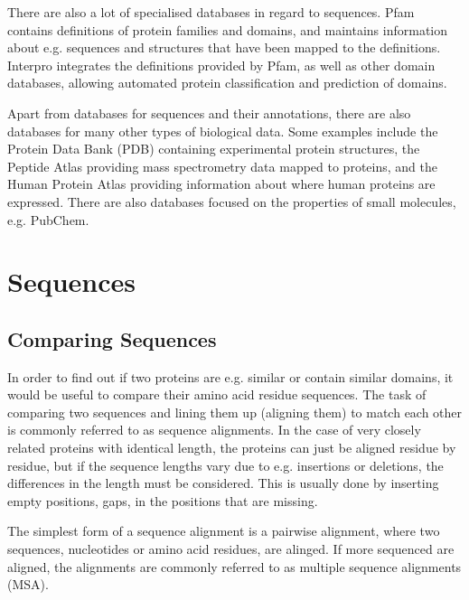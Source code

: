 \documentclass[a4paper, twoside, 12pt, openright]{report}
\begin{document}
There are also a lot of specialised databases in regard to sequences. Pfam\cite{finn_pfam:_2014} contains definitions of protein families and domains, and maintains information about e.g. sequences and structures that have been mapped to the definitions. Interpro\cite{finn_interpro_2017} integrates the definitions provided by Pfam, as well as other domain databases, allowing automated protein classification and prediction of domains.

Apart from databases for sequences and their annotations, there are also databases for many other types of biological data. Some examples include the Protein Data Bank (PDB)\cite{berman_protein_2000}  containing experimental protein structures, the Peptide Atlas\cite{desiere_peptideatlas_2006} providing mass spectrometry data mapped to proteins, and the Human Protein Atlas\cite{uhlen_tissue-based_2015} providing information about where human proteins are expressed. There are also databases focused on the properties of small molecules, e.g. PubChem\cite{kim_pubchem_2016}.


\section{Sequences}
\label{sec:method_sequences}

\subsection{Comparing Sequences}
\label{sec:alignments}

In order to find out if two proteins are e.g. similar or contain similar domains, it would be useful to compare their amino acid residue sequences. The task of comparing two sequences and lining them up (aligning them) to match each other is commonly referred to as sequence alignments. In the case of very closely related proteins with identical length, the proteins can just be aligned residue by residue, but if the sequence lengths vary due to e.g. insertions or deletions, the differences in the length must be considered. This is usually done by inserting empty positions, gaps, in the positions that are missing.

The simplest form of a sequence alignment is a pairwise alignment, where two sequences, nucleotides or amino acid residues, are alinged. If more sequenced are aligned, the alignments are commonly referred to as multiple sequence alignments (MSA). 
\end{document}
